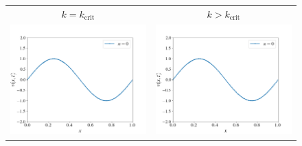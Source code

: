 \documentclass[12pt, reqno]{report}
\theoremstyle{definition}
\theoremstyle{remark}
\begin{document}
\begin{figure}[H]
    \centering

    \begin{tabular}{cc}
        $k=k_\text{crit}$ & $k>k_\text{crit}$\\
        \includegraphics[width=\acfdwidth]{media_paper/stable_AC_FD_0} & 
        \includegraphics[width=\acfdwidth]{media_paper/unstable_AC_FD_0} \\

\end{tabular}
\end{figure}
\end{document}
